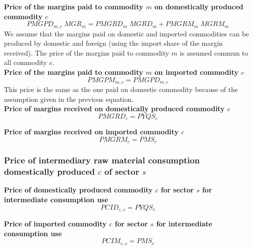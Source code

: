 \documentclass[12pt]{article}
\numberwithin{equation}{section}
\begin{document}
\noindent\textbf{Price of the margins paid to commodity $m$ on domestically produced commodity $c$} \\
\begin{dmath}
PMGPD_{m, c} \; MGR_{m} = PMGRD_{m} \; MGRD_{m} + PMGRM_{m} \; MGRM_{m}
\end{dmath}
We assume that the margins paid on domestic and imported commodities can be produced by domestic and foreign (using the import share of the margin received). The price of the margins paid to commodity $m$ is assumed commun to all commodity $c$. \\

\noindent\textbf{Price of the margins paid to commodity $m$ on imported commodity $c$} \\
\begin{dmath}
PMGPM_{m, c} = PMGPD_{m, c}
\end{dmath}
This price is the same as the one paid on domestic commodity because of the assumption given in the previous equation. \\

\noindent\textbf{Price of margins received on domestically produced commodity $c$} \\
\begin{dmath}
PMGRD_{c} = PYQS_{c}
\end{dmath}

\noindent\textbf{Price of margins received on imported commodity $c$} \\
\begin{dmath}
PMGRM_{c} = PMS_{c}
\end{dmath}



\subsubsection{Price of intermediary raw material consumption domestically produced $c$ of sector $s$}



\noindent\textbf{Price of domestically produced commodity $c$ for sector $s$ for intermediate consumption use} \\
\begin{dmath}
PCID_{c, s} = PYQS_{c}
\end{dmath}

\noindent\textbf{Price of imported commodity $c$ for sector $s$ for intermediate consumption use} \\
\begin{dmath}
PCIM_{c, s} = PMS_{c}
\end{dmath}
\end{document}
